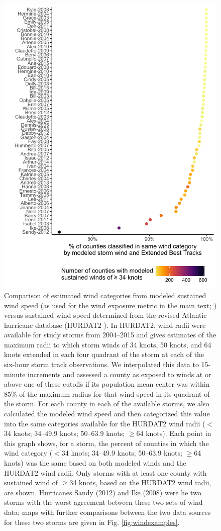 \documentclass[fleqn,10pt,lineno]{olplainarticle}
\begin{document}
\begin{figure}[tbhp!]
\centering
\includegraphics[width=0.6\linewidth]{figures/windcomparison}
\caption{Comparison of estimated wind categories from modeled sustained wind speed (as used for the wind exposure metric in the main text; \cite{stormwindmodel}) versus sustained wind speed determined from the revised Atlantic hurricane database (HURDAT2 \cite{landsea2013}). In HURDAT2, wind radii were available for study storms from 2004--2015 and gives estimates of the maximum radii to which storm winds of 34 knots, 50 knots, and 64 knots extended in each four quadrant of the storm at each of the six-hour storm track observations. We interpolated this data to 15-minute increments and assessed a county as exposed to winds at or above one of these cutoffs if its population mean center was within 85\% of the maximum radius for that wind speed in its quadrant of the storm. For each county in each of the available storms, we also calculated the modeled wind speed \cite{stormwindmodel} and then categorized this value into the same categories available for the HURDAT2 wind radii ($<$34 knots; 34--49.9 knots; 50--63.9 knots; $\ge$64 knots). Each point in this graph shows, for a storm, the percent of counties in which the wind category ($<$34 knots; 34--49.9 knots; 50--63.9 knots; $\ge$64 knots) was the same based on both modeled winds and the HURDAT2 wind radii. Only storms with at least one county with sustained wind of $\ge$34 knots, based on the HURDAT2 wind radii, are shown. Hurricanes Sandy (2012) and Ike (2008) were he two storms with the worst agreement between these two sets of wind data; maps with further comparisons between the two data sources for these two storms are given in Fig. \ref{fig:windexamples}.}
\label{fig:windcomparison}
\end{figure}
\end{document}
